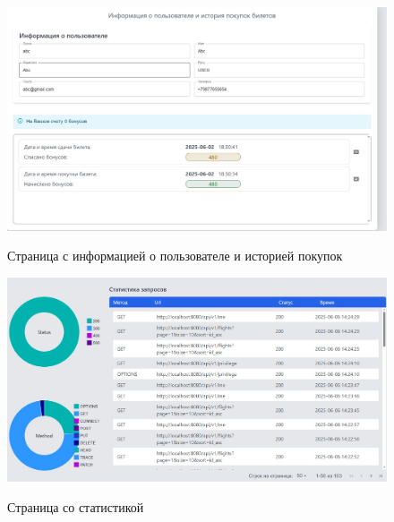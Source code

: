 \begin{figure}[H]
	\begin{center}
		{\includegraphics[scale = 0.4]{img/pages/page-06.jpg}}
		\caption{Страница с информацией о пользователе и историей покупок}
		\label{fig:page-06}
	\end{center}
\end{figure}

\begin{figure}[H]
	\begin{center}
		{\includegraphics[scale = 0.4]{img/pages/page-07.jpg}}
		\caption{Страница со статистикой}
		\label{fig:page-07}
	\end{center}
\end{figure}
